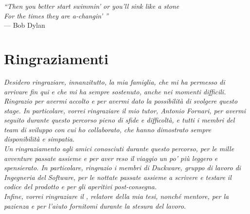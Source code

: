
\newpage
\cleardoublepage
{}
{}

\begin{flushright}{
	\slshape    
	``Then you better start swimmin’ or you’ll sink like a stone\\For the times they are a-changin’
''} \\ 
	\medskip
    --- Bob Dylan
\end{flushright}


\bigskip

\begingroup
\let\clearpage\relax
\let\cleardoublepage\relax
\let\cleardoublepage\relax


\chapter*{Ringraziamenti}

 \noindent \textit{Desidero ringraziare, innanzitutto, la mia famiglia, che mi ha permesso di arrivare fin qui e che mi ha sempre sostenuto, anche nei momenti difficili.}\\
 
 \noindent \textit{Ringrazio \AD{} per avermi accolto e per avermi dato la possibilità di svolgere questo stage. In particolare, vorrei ringraziare il mio tutor, Antonio Fornari, per avermi seguito durante questo percorso pieno di sfide e difficoltà, e tutti i membri del team di sviluppo con cui ho collaborato, che hanno dimostrato sempre disponibilità e simpatia.}\\
 
 \noindent \textit{Un ringraziamento agli amici conosciuti durante questo percorso, per le mille avventure passate assieme e per aver reso il viaggio un po' più leggero e spensierato. In particolare, ringrazio i membri di Duckware, gruppo di lavoro di Ingegneria del Software, per le nottate passate assieme a scrivere e testare il codice del prodotto e per gli aperitivi post-consegna.}\\
 
 \noindent \textit{Infine, vorrei ringraziare il \profTitle \myProf, relatore della mia tesi, nonché mentore, per la pazienza e per l'aiuto fornitomi durante la stesura del lavoro.}\\

